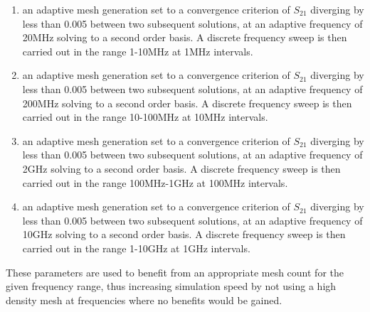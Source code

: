 \begin{enumerate}
\item{an adaptive mesh generation set to a convergence criterion of $S_{21}$ diverging by less than 0.005 between two subsequent solutions, at an adaptive frequency of 20MHz solving to a second order basis. A discrete frequency sweep is then carried out in the range 1-10MHz at 1MHz intervals.}
\item{an adaptive mesh generation set to a convergence criterion of $S_{21}$ diverging by less than 0.005 between two subsequent solutions, at an adaptive frequency of 200MHz solving to a second order basis. A discrete frequency sweep is then carried out in the range 10-100MHz at 10MHz intervals.}
\item{an adaptive mesh generation set to a convergence criterion of $S_{21}$ diverging by less than 0.005 between two subsequent solutions, at an adaptive frequency of 2GHz solving to a second order basis. A discrete frequency sweep is then carried out in the range 100MHz-1GHz at 100MHz intervals.}
\item{an adaptive mesh generation set to a convergence criterion of $S_{21}$ diverging by less than 0.005 between two subsequent solutions, at an adaptive frequency of 10GHz solving to a second order basis. A discrete frequency sweep is then carried out in the range 1-10GHz at 1GHz intervals.}
\end{enumerate}

These parameters are used to benefit from an appropriate mesh count for the given frequency range, thus increasing simulation speed by not using a high density mesh at frequencies where no benefits would be gained.

